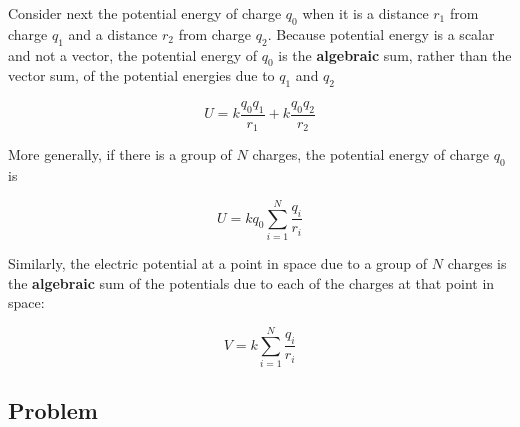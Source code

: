 \documentclass{article}
\begin{document}
Consider next the potential energy of charge $q_0$ when it is a distance $r_1$ from charge $q_1$ and a distance $r_2$ from charge $q_2$. Because potential energy is a scalar and not a vector, the potential energy of $q_0$ is the \textbf{algebraic} sum, rather than the vector sum, of the potential energies due to $q_1$ and $q_2$

\begin{equation}
U=k\frac{q_0q_1}{r_1}+k\frac{q_0q_2}{r_2}
\end{equation}

More generally, if there is a group of $N$ charges, the potential energy of charge $q_0$ is

\begin{equation}
U=k q_0 \sum_{i=1}^N {\frac{q_i}{r_i}}
\end{equation}

Similarly, the electric potential at a point in space due to a group of $N$ charges is the \textbf{algebraic} sum of the potentials due to each of the charges at that point in space:

\begin{equation}
V=k \sum_{i=1}^N {\frac{q_i}{r_i}}
\end{equation}

\subsection{Problem}


\end{document}
